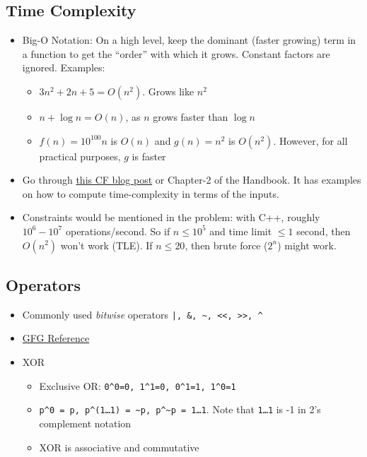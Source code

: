 \documentclass{article}
\newcommand{\I}[1]{\textit{#1}}
\newcommand{\T}[1]{\texttt{#1}}
\begin{document}
\begin{sloppypar}
    \subsection{Time Complexity}
    \begin{itemize}
        \item Big-O Notation: On a high level, keep the dominant (faster growing) term in a function to get the ``order'' with which it grows. Constant factors are ignored. Examples:
        \begin{itemize}
            \item $3n^2 + 2n + 5 = O(n^2)$. Grows like $n^2$
            \item $n + \log{n} = O(n)$, as $n$ grows faster than $\log{n}$
            \item $f(n) = 10^{100}n$ is $O(n)$ and $g(n) = n^2$ is $O(n^2)$. However, for all practical purposes, $g$ is faster
        \end{itemize}
        \item Go through \href{https://codeforces.com/blog/entry/104888}{this CF blog post} or Chapter-2 of the Handbook. It has examples on how to compute time-complexity in terms of the inputs.
        \item Constraints would be mentioned in the problem: with C++, roughly $10^6-10^7$ operations/second. So if $n\le 10^5$ and time limit $\le 1$ second, then $O(n^2)$ won't work (TLE). If $n\le 20$, then brute force ($2^n$) might work.
    \end{itemize}

    \subsection{Operators}
    \begin{itemize}
        \item Commonly used \I{bitwise} operators \T{|, \&, \~{}, <<, >>, \^{}}
        \item \href{https://www.geeksforgeeks.org/operators-in-c/}{GFG Reference}
        \item XOR
        \begin{itemize}
            \item Exclusive OR: \T{0\^{}0=0, 1\^{}1=0, 0\^{}1=1, 1\^{}0=1}
            \item \T{p\^{}0 = p, p\^{}(1\dots1) = \~{}p, p\^{}\~{}p = 1\dots1}. Note that \T{1\dots1} is -1 in 2's complement notation
            \item XOR is associative and commutative
        \end{itemize}
    \end{itemize}


\end{sloppypar}
\end{document}
